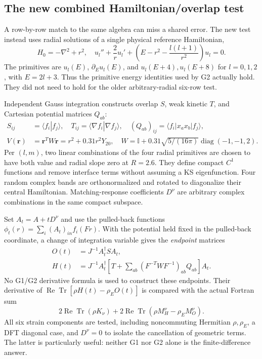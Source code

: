 \documentclass[11pt]{article}
\newcommand{\Tr}{\operatorname{Tr}}
\newcommand{\Rea}{\operatorname{Re}}
\newcommand{\Id}{\mathbb I}
\begin{document}
\subsection{The new combined Hamiltonian/overlap test}\label{sec:combined}
A row-by-row match to the same algebra can miss a shared error. The new test instead uses radial solutions of a single physical reference Hamiltonian,
\begin{equation}
 H_0=-\nabla^2+r^2,\quad
 u_l''+\frac2r u_l'+\left(E-r^2-\frac{l(l+1)}{r^2}\right)u_l=0.
\end{equation}
The primitives are $u_l(E)$, $\partial_Eu_l(E)$, and $u_l(E+4),u_l(E+8)$ for $l=0,1,2$, with $E=2l+3$. Thus the primitive energy identities used by G2 actually hold. They did not need to hold for the older arbitrary-radial six-row test.

Independent Gauss integration constructs overlap $S$, weak kinetic $T$, and Cartesian potential matrices $Q_{ab}$:
\begin{align}
 S_{ij}&=\langle f_i|f_j\rangle,\quad T_{ij}=\langle\nabla f_i|\nabla f_j\rangle,\quad
 (Q_{ab})_{ij}=\langle f_i|x_a x_b|f_j\rangle,\\
 V(\bm r)&=\bm r^TW\bm r=r^2+0.31r^2Y_{20},\quad
 W=\Id+0.31\sqrt{5/(16\pi)}\operatorname{diag}(-1,-1,2).
\end{align}
Per $(l,m)$, two linear combinations of the four radial primitives are chosen to have both value and radial slope zero at $R=2.6$. They define compact $C^1$ functions and remove interface terms without assuming a KS eigenfunction. Four random complex bands are orthonormalized and rotated to diagonalize their central Hamiltonian. Matching-response coefficients $D^\nu$ are arbitrary complex combinations in the same compact subspace.

Set $A_t=A+tD^\nu$ and use the pulled-back functions $\phi_t(r)=\sum_i(A_t)_{in}f_i(Fr)$. With the potential held fixed in the pulled-back coordinate, a change of integration variable gives the \emph{endpoint} matrices
\begin{align}
 O(t)&=J^{-1}A_t^\dagger S A_t,\\
 H(t)&=J^{-1}A_t^\dagger\left[T+\sum_{ab}(F^{-T}WF^{-1})_{ab}Q_{ab}\right]A_t .
\end{align}
No G1/G2 derivative formula is used to construct these endpoints. Their derivative of $\Rea\Tr[\rho H(t)-\rho_E O(t)]$ is compared with the actual Fortran sum
\begin{equation}
 2\Rea\Tr(\rho K_\nu)+2\Rea\Tr(\rho M_H^\nu-\rho_E M_O^\nu).
\end{equation}
All six strain components are tested, including noncommuting Hermitian $\rho,\rho_E$, a DFT diagonal case, and $D^\nu=0$ to isolate the cancellation of geometric terms. The latter is particularly useful: neither G1 nor G2 alone is the finite-difference answer.
\end{document}
